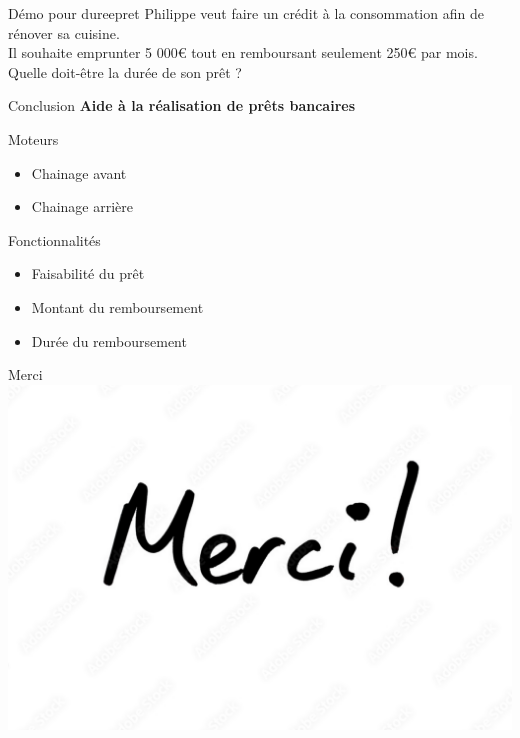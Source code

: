 \documentclass[
  ignorenonframetext,
]{beamer}
\providecommand{\tightlist}{%
  \setlength{\itemsep}{0pt}\setlength{\parskip}{0pt}}
\begin{document}
\begin{frame}{Démo pour dureepret}
\protect\hypertarget{duxe9mo-pour-dureepret}{}
Philippe veut faire un crédit à la consommation afin de rénover sa
cuisine.\\
Il souhaite emprunter 5 000€ tout en remboursant seulement 250€ par
mois.\\
Quelle doit-être la durée de son prêt ?\\
\end{frame}

\begin{frame}{Conclusion}
\protect\hypertarget{conclusion}{}
\textbf{Aide à la réalisation de prêts bancaires}

\begin{block}{Moteurs}
\protect\hypertarget{moteurs}{}
\begin{itemize}
\tightlist
\item
  Chainage avant
\item
  Chainage arrière
\end{itemize}
\end{block}

\begin{block}{Fonctionnalités}
\protect\hypertarget{fonctionnalituxe9s}{}
\begin{itemize}
\tightlist
\item
  Faisabilité du prêt
\item
  Montant du remboursement
\item
  Durée du remboursement
\end{itemize}
\end{block}
\end{frame}

\begin{frame}{Merci}
\protect\hypertarget{merci}{}
\includegraphics{img/merci.png}
\end{frame}
\end{document}
